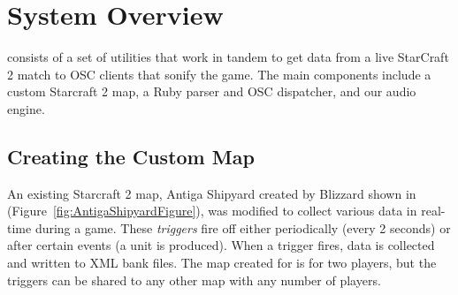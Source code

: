 \documentclass{nime-document-class}
\begin{document}

\section{System Overview}
\projectName{} consists of a set of utilities that work in tandem to get data from a live StarCraft 2 match to OSC clients that sonify the game.
The main components include a custom Starcraft 2 map, a Ruby parser and OSC dispatcher, and our audio engine.

\subsection{Creating the Custom Map}
An existing Starcraft 2 map, Antiga Shipyard created by Blizzard shown in (Figure~\ref{fig:AntigaShipyardFigure}), was modified to collect various data in real-time during a game.
These {\em triggers} fire off either periodically (every 2 seconds) or after certain events (a unit is produced). When a trigger fires, data is collected and written to XML bank files.
The map created for \projectName{} is for two players, but the triggers can be shared to any other map with any number of players. 
\end{document}
